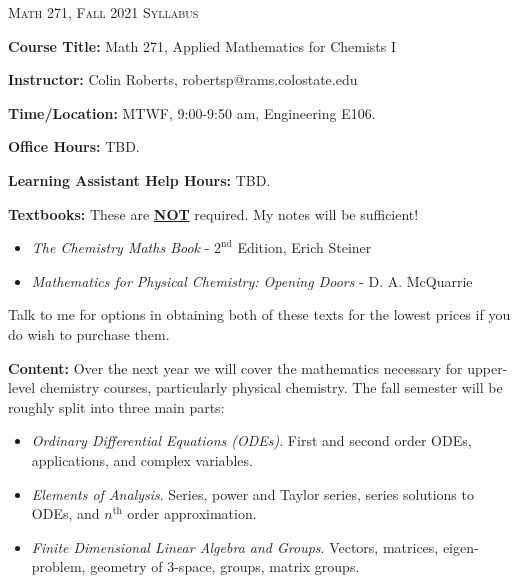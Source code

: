 \documentclass[12pt]{amsbook}
\begin{document}

\SetWatermarkText{
\begin{minipage}[c][8cm]{8cm}
\begin{center}
 
\end{center}
\end{minipage}
}




\begin{center}
   \textsc{\large Math 271, Fall 2021 Syllabus}
\end{center}
\vspace{.5cm}

\textbf{Course Title:} Math 271, Applied Mathematics for Chemists I

\textbf{Instructor:} Colin Roberts, robertsp@rams.colostate.edu

\textbf{Time/Location:} MTWF, 9:00-9:50 am, Engineering E106.  

\textbf{Office Hours:} TBD.

\textbf{Learning Assistant Help Hours:} TBD.

\textbf{Textbooks:} These are \underline{\textbf{NOT}} required.  My notes will be sufficient!
\begin{itemize}
    \item \emph{The Chemistry Maths Book} - $2^{\text{nd}}$ Edition, Erich Steiner
    \item \emph{Mathematics for Physical Chemistry: Opening Doors} - D. A. McQuarrie
\end{itemize}
Talk to me for options in obtaining both of these texts for the lowest prices if you do wish to purchase them. 

\textbf{Content:} Over the next year we will cover the mathematics necessary for upper-level chemistry courses, particularly physical chemistry. The fall semester will be roughly split into three main parts:
\begin{itemize}
    \item \emph{Ordinary Differential Equations (ODEs)}. First and second order ODEs, applications, and complex variables.
    \item \emph{Elements of Analysis}. Series, power and Taylor series, series solutions to ODEs, and $n^\textrm{th}$ order approximation.
    \item \emph{Finite Dimensional Linear Algebra and Groups}. Vectors, matrices, eigen-problem, geometry of 3-space, groups, matrix groups.
\end{itemize}
\end{document}
